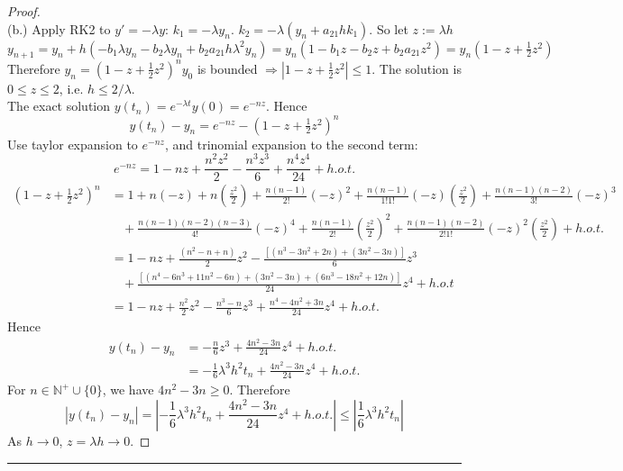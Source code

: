 \documentclass[a4paper, 10pt]{article}
\theoremstyle{definition}
\theoremstyle{hSol}
\begin{document}
\begin{proof}
~\\
(b.) Apply RK2 to $y'=- \lambda y$: $k_1 = - \lambda y_n$. $k_2 = -\lambda (y_n + a_{21} hk_1)$. So let $z := \lambda h$
$$
y_{n+1} = y_n + h (-b_1 \lambda y_n - b_2 \lambda y_n + b_2 a_{21} h \lambda^2 y_n) = y_n (1-b_1 z-b_2z + b_2 a_{21} z^2) = y_n(1-z+\tfrac{1}{2}z^2)
$$
Therefore $y_n = (1-z+\tfrac{1}{2}z^2)^n y_0$ is bounded $\Rightarrow |1-z+\tfrac{1}{2}z^2|\leq 1$. The solution is $0\leq z\leq 2$, i.e. $h\leq 2/\lambda$. \\
The exact solution $y(t_n) = e^{-\lambda t}y(0) = e^{-nz}$. Hence 
$$
y(t_n) - y_n = e^{-nz} - (1-z+\tfrac{1}{2}z^2)^n
$$
Use taylor expansion to $e^{-nz}$, and trinomial expansion to the second term:
$$
e^{-nz} = 1 - nz + \frac{n^2 z^2}{2} - \frac{n^3z^3}{6} + \frac{n^4z^4}{24} + h.o.t.
$$
\begin{equation}
  \begin{split}
    (1-z+\tfrac{1}{2}z^2)^n &= 1 + n(-z) + n(\tfrac{z^2}{2}) + \tfrac{n(n-1)}{2!}(-z)^2 + \tfrac{n(n-1)}{1!1!}(-z)(\tfrac{z^2}{2}) + \tfrac{n(n-1)(n-2)}{3!}(-z)^3 \\
    &~~~~+ \tfrac{n(n-1)(n-2)(n-3)}{4!}(-z)^4 + \tfrac{n(n-1)}{2!}(\tfrac{z^2}{2})^2 + \tfrac{n(n-1)(n-2)}{2!1!}(-z)^2(\tfrac{z^2}{2})+h.o.t. \\
    &= 1-nz + \tfrac{(n^2-n+n)}{2} z^2- \tfrac{[(n^3-3n^2+2n)+(3n^2-3n)]}{6}z^3\\
    &~~~~+\tfrac{[(n^4-6n^3+11n^2-6n)+(3n^2-3n)+(6n^3-18n^2+12n)]}{24}z^4 + h.o.t\\
    &=1-nz + \tfrac{n^2}{2}z^2 - \tfrac{n^3-n}{6}z^3 + \tfrac{n^4-4n^2+3n}{24}z^4  + h.o.t.
  \end{split}
\end{equation}
Hence
\begin{equation}
  \begin{split}
    y(t_n) - y_n &= -\frac{n}{6}z^3 + \frac{4n^2-3n}{24}z^4 + h.o.t. \\
    &= -\frac{1}{6}\lambda^3 h^2 t_n + \frac{4n^2-3n}{24}z^4 + h.o.t.
  \end{split}
\end{equation}
For $n \in \mathbb{N}^{+} \cup \{0\}$, we have $4n^2-3n \geq 0$. Therefore
$$
|y(t_n) - y_n| = \left|-\frac{1}{6}\lambda^3 h^2 t_n + \frac{4n^2-3n}{24}z^4 + h.o.t.\right| \leq \left|\frac{1}{6}\lambda^3 h^2 t_n\right|
$$
As $h\to 0$, $z=\lambda h\to 0$.

\end{proof} 
\noindent\rule{16cm}{0.4pt}
\end{document}
